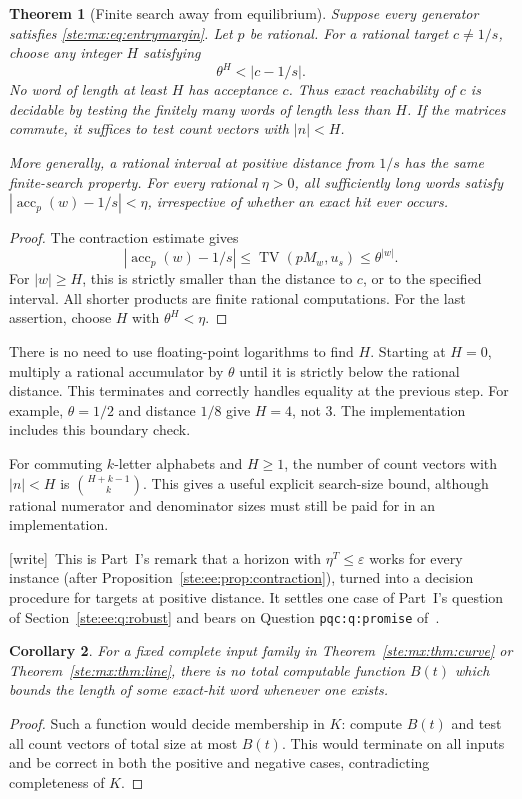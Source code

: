 \documentclass[11pt,letterpaper]{article}
\newtheorem{theorem}{Theorem}[section]
\newtheorem{corollary}[theorem]{Corollary}
\theoremstyle{definition}
\theoremstyle{remark}
\newcommand{\TV}{\operatorname{TV}}
\newcommand{\acc}{\operatorname{acc}}
\newcommand{\wtag}{\textup{[write]}}
\begin{document}
\begin{theorem}[Finite search away from equilibrium]\label{ste:mx:thm:robust}
Suppose every generator satisfies \eqref{ste:mx:eq:entrymargin}. Let $p$ be rational.
For a rational target $c\ne1/s$, choose any integer $H$ satisfying
\begin{equation}\label{ste:mx:eq:cutoff}
 \theta^H<|c-1/s|.
\end{equation}
No word of length at least $H$ has acceptance $c$. Thus exact reachability of
$c$ is decidable by testing the finitely many words of length less than $H$.
If the matrices commute, it suffices to test count vectors with $|n|<H$.

More generally, a rational interval at positive distance from $1/s$ has the
same finite-search property. For every rational $\eta>0$, all sufficiently
long words satisfy $|\acc_p(w)-1/s|<\eta$, irrespective of whether an exact
hit ever occurs.
\end{theorem}
\begin{proof}
The contraction estimate gives
\[
 |\acc_p(w)-1/s|\leq\TV(pM_w,u_s)\leq\theta^{|w|}.
\]
For $|w|\geq H$, this is strictly smaller than the distance to $c$, or to
the specified interval. All shorter products are finite rational computations.
For the last assertion, choose $H$ with $\theta^H<\eta$.
\end{proof}

There is no need to use floating-point logarithms to find $H$. Starting at
$H=0$, multiply a rational accumulator by $\theta$ until it is strictly below
the rational distance. This terminates and correctly handles equality at the
previous step. For example, $\theta=1/2$ and distance $1/8$ give $H=4$, not 3.
The implementation includes this boundary check.

For commuting $k$-letter alphabets and $H\geq1$, the number of count vectors
with $|n|<H$ is $\binom{H+k-1}{k}$. This gives a useful explicit search-size
bound, although rational numerator and denominator sizes must still be paid
for in an implementation.

\wtag\ This is Part~I's remark that a horizon with $\eta^T\leq\varepsilon$ works for every instance (after Proposition~\ref{ste:ee:prop:contraction}), turned into a decision procedure for targets at positive distance. It settles one case of Part~I's question of Section~\ref{ste:ee:q:robust} and bears on Question \texttt{pqc:q:promise} of~\cite{pqc}.

\begin{corollary}\label{ste:mx:cor:nohorizon}
For a fixed complete input family in Theorem~\ref{ste:mx:thm:curve} or
Theorem~\ref{ste:mx:thm:line}, there is no total computable function $B(t)$ which
bounds the length of some exact-hit word whenever one exists.
\end{corollary}
\begin{proof}
Such a function would decide membership in $K$: compute $B(t)$ and test all
count vectors of total size at most $B(t)$. This would terminate on all inputs
and be correct in both the positive and negative cases, contradicting
completeness of $K$.
\end{proof}
\end{document}
